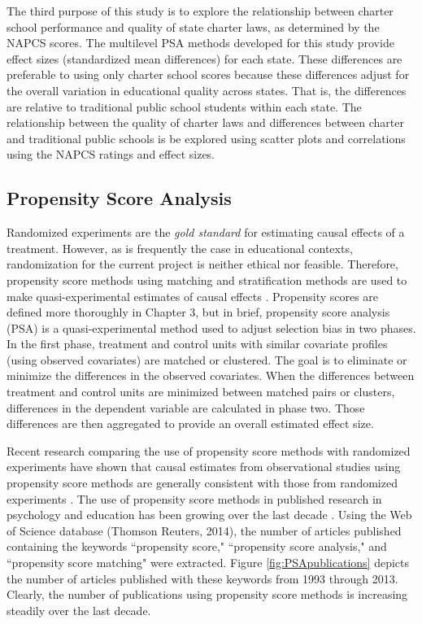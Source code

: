 \documentclass[letterpaper,12p,twoside]{article} %
\begin{document}
The third purpose of this study is to explore the relationship between charter school performance and quality of state charter laws, as determined by the NAPCS scores. The multilevel PSA methods developed for this study provide effect sizes (standardized mean differences) for each state. These differences are preferable to using only charter school scores because these differences adjust for the overall variation in educational quality across states. That is, the differences are relative to traditional public school students within each state. The relationship between the quality of charter laws and differences between charter and traditional public schools is be explored using scatter plots and correlations using the NAPCS ratings and effect sizes.

\subsection{Propensity Score Analysis}

Randomized experiments are the \textit{gold standard} for estimating causal effects of a treatment. However, as is frequently the case in educational contexts, randomization for the current project is neither ethical nor feasible. Therefore, propensity score methods \cite{RosenbaumRubin1983} using matching \cite{StuartRubin2008,Stuart2010} and stratification methods \cite{RaudenbushHongRowan2003} are used to make quasi-experimental estimates of causal effects \cite<see also>{SchneiderEtAl2007,StuartRubin2008}. Propensity scores are defined more thoroughly in Chapter 3, but in brief, propensity score analysis (PSA) is a quasi-experimental method used to adjust selection bias in two phases. In the first phase, treatment and control units with similar covariate profiles (using observed covariates) are matched or clustered. The goal is to eliminate or minimize the differences in the observed covariates. When the differences between treatment and control units are minimized between matched pairs or clusters, differences in the dependent variable are calculated in phase two. Those differences are then aggregated to provide an overall estimated effect size.

Recent research comparing the use of propensity score methods with randomized experiments have shown that causal estimates from observational studies using propensity score methods are generally consistent with those from randomized experiments \cite{CookShadishWong2008,ShadishClarkSteiner2008}. The use of propensity score methods in published research in psychology and education has been growing over the last decade \cite{ThoemmesKim2011}. Using the Web of Science database (Thomson Reuters, 2014), the number of articles published containing the keywords ``propensity score," ``propensity score analysis," and ``propensity score matching" were extracted. Figure \ref{fig:PSApublications} depicts the number of articles published with these keywords from 1993 through 2013. Clearly, the number of publications using propensity score methods is increasing steadily over the last decade.
\end{document}
